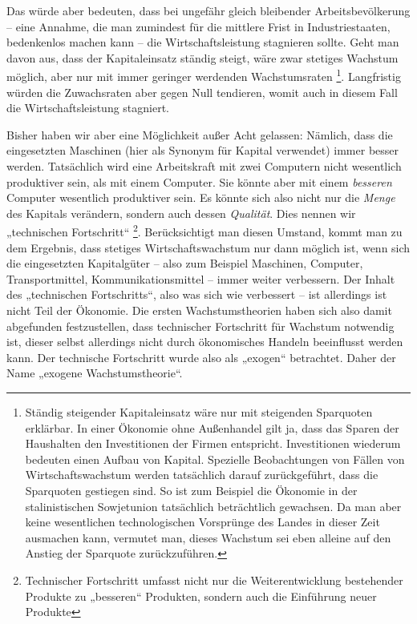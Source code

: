 Das würde aber bedeuten, dass bei ungefähr gleich bleibender Arbeitsbevölkerung – eine Annahme, die man zumindest für die mittlere Frist in Industriestaaten, bedenkenlos machen kann – die Wirtschaftsleistung stagnieren sollte. Geht man davon aus, dass der Kapitaleinsatz ständig steigt, wäre zwar stetiges Wachstum möglich, aber nur mit immer geringer werdenden Wachstumsraten \footnote{Ständig steigender Kapitaleinsatz wäre nur mit steigenden Sparquoten erklärbar. In einer Ökonomie ohne Außenhandel gilt ja, dass das Sparen der Haushalten den Investitionen der Firmen entspricht. Investitionen wiederum bedeuten einen Aufbau von Kapital. Spezielle Beobachtungen von Fällen von Wirtschaftswachstum werden tatsächlich darauf zurückgeführt, dass die Sparquoten gestiegen sind. So ist zum Beispiel die Ökonomie in der stalinistischen Sowjetunion tatsächlich beträchtlich gewachsen. Da man aber keine wesentlichen technologischen Vorsprünge des Landes in dieser Zeit ausmachen kann, vermutet man, dieses Wachstum sei eben alleine auf den Anstieg der Sparquote zurückzuführen.}. Langfristig würden die Zuwachsraten aber gegen Null tendieren, womit auch in diesem Fall die Wirtschaftsleistung stagniert.

Bisher haben wir aber eine Möglichkeit außer Acht gelassen: Nämlich, dass die eingesetzten Maschinen (hier als Synonym für Kapital verwendet) immer besser werden. Tatsächlich wird eine Arbeitskraft mit zwei Computern nicht wesentlich produktiver sein, als mit einem Computer. Sie könnte aber mit einem \textit{besseren} Computer wesentlich produktiver sein. Es könnte sich also nicht nur die \textit{Menge} des Kapitals verändern, sondern auch dessen \textit{Qualität}. Dies nennen wir „technischen Fortschritt“ \footnote{Technischer Fortschritt umfasst nicht nur die Weiterentwicklung bestehender Produkte zu „besseren“ Produkten, sondern auch die Einführung neuer Produkte}.
Berücksichtigt man diesen Umstand, kommt man zu dem Ergebnis, dass stetiges Wirtschaftswachstum nur dann möglich ist, wenn sich die eingesetzten Kapitalgüter – also zum Beispiel Maschinen, Computer, Transportmittel, Kommunikationsmittel – immer weiter verbessern.
Der Inhalt des „technischen Fortschritts“, also was sich wie verbessert – ist allerdings ist nicht Teil der Ökonomie. Die ersten Wachstumstheorien haben sich also damit abgefunden festzustellen, dass technischer Fortschritt für Wachstum notwendig ist, dieser selbst allerdings nicht durch ökonomisches Handeln beeinflusst werden kann. Der technische Fortschritt wurde also als „exogen“ betrachtet. Daher der Name „exogene Wachstumstheorie“.
















